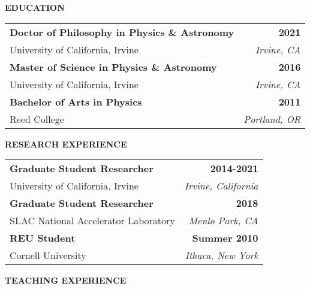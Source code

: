 %
\curriculumvitae
{

\textbf{EDUCATION}
  
  \begin{tabular*}{1\textwidth}{@{\extracolsep{\fill}}lr}
    \textbf{Doctor of Philosophy in Physics \& Astronomy} & \textbf{2021} \\
    \vspace{6pt}
    University of California, Irvine & \emph{Irvine, CA} \\
    \textbf{Master of Science in Physics \& Astronomy} & \textbf{2016} \\
    \vspace{6pt}
    University of California, Irvine & \emph{Irvine, CA} \\
    \textbf{Bachelor of Arts in Physics} & \textbf{2011} \\
    \vspace{6pt}
    Reed College & \emph{Portland, OR} \\
  \end{tabular*}

\vspace{12pt}
\textbf{RESEARCH EXPERIENCE}

  \begin{tabular*}{1\textwidth}{@{\extracolsep{\fill}}lr}
    \textbf{Graduate Student Researcher} & \textbf{2014-2021} \\
    \vspace{6pt}
    University of California, Irvine & \emph{Irvine, California} \\
    \textbf{Graduate Student Researcher} & \textbf{2018} \\
    \vspace{6pt}
    SLAC National Accelerator Laboratory & \emph{Menlo Park, CA} \\
    \textbf{REU Student} & \textbf{Summer 2010} \\
    \vspace{6pt}
    Cornell University & \emph{Ithaca, New York} \\
  \end{tabular*}

\vspace{12pt}
\textbf{TEACHING EXPERIENCE}

}
